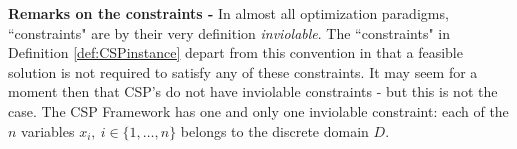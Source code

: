 \textbf{Remarks on the constraints - }In almost all optimization paradigms, ``constraints" are by their very definition \textit{inviolable}. 
The ``constraints" in Definition \ref{def:CSPinstance} depart from this convention in that a feasible solution is not required to satisfy any of these constraints. 
It may seem for a moment then that CSP's do not have inviolable constraints - but this is not the case. 
The CSP Framework has one and only one inviolable constraint: each of the $n$ variables $x_i, ~ i \in\{1,\ldots,n\}$ belongs to the discrete domain $D$. 

%
